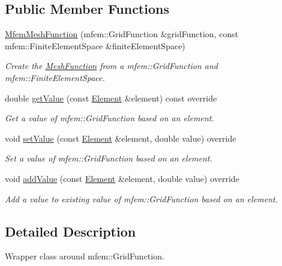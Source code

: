 \subsection*{Public Member Functions}
\begin{DoxyCompactItemize}
\item 
\hyperlink{classraytracer_1_1geometry_1_1MfemMeshFunction_a38898aa9932de5f6d8ceecdf27d26761}{Mfem\+Mesh\+Function} (mfem\+::\+Grid\+Function \&grid\+Function, const mfem\+::\+Finite\+Element\+Space \&finite\+Element\+Space)
\begin{DoxyCompactList}\small\item\em Create the \hyperlink{classraytracer_1_1geometry_1_1MeshFunction}{Mesh\+Function} from a mfem\+::\+Grid\+Function and mfem\+::\+Finite\+Element\+Space. \end{DoxyCompactList}\item 
double \hyperlink{classraytracer_1_1geometry_1_1MfemMeshFunction_a76b37f146c8471f95c0e2486024857f7}{get\+Value} (const \hyperlink{classraytracer_1_1geometry_1_1Element}{Element} \&element) const override
\begin{DoxyCompactList}\small\item\em Get a value of mfem\+::\+Grid\+Function based on an element. \end{DoxyCompactList}\item 
void \hyperlink{classraytracer_1_1geometry_1_1MfemMeshFunction_a3153afe8fbdf71f1f5f7d7a44c507536}{set\+Value} (const \hyperlink{classraytracer_1_1geometry_1_1Element}{Element} \&element, double value) override
\begin{DoxyCompactList}\small\item\em Set a value of mfem\+::\+Grid\+Function based on an element. \end{DoxyCompactList}\item 
void \hyperlink{classraytracer_1_1geometry_1_1MfemMeshFunction_a886efe65ad4667b09e00381c57bb7be8}{add\+Value} (const \hyperlink{classraytracer_1_1geometry_1_1Element}{Element} \&element, double value) override
\begin{DoxyCompactList}\small\item\em Add a value to existing value of mfem\+::\+Grid\+Function based on an element. \end{DoxyCompactList}\end{DoxyCompactItemize}


\subsection{Detailed Description}
Wrapper class around mfem\+::\+Grid\+Function. 

